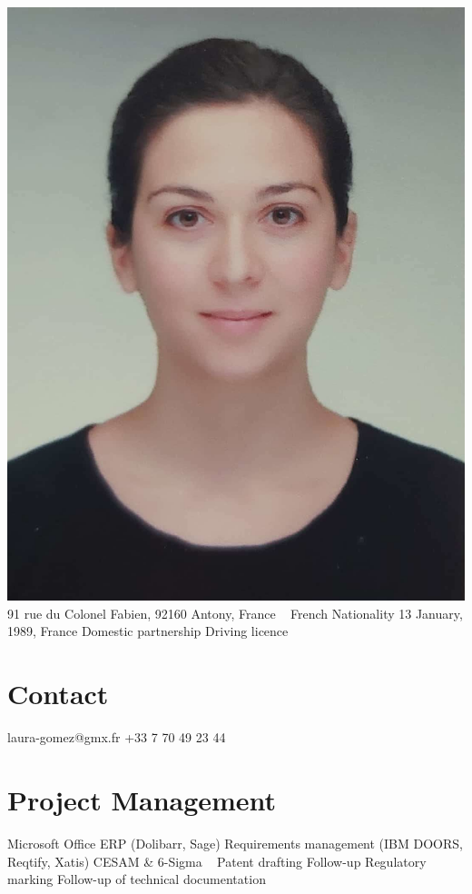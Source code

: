 \documentclass{cv-style}     %
\begin{document}


\begin{aside}
    \includegraphics[width=.8\columnwidth]{img/LG}
    91 rue du Colonel Fabien, 92160 Antony, France
    ~
    French Nationality
    13 January, 1989, France
    Domestic partnership
    Driving licence
    \section{Contact}
    laura-gomez@gmx.fr
    +33 7 70 49 23 44    
    \section{Project Management}
    Microsoft Office
    ERP (Dolibarr, Sage)
    Requirements management (IBM DOORS, Reqtify, Xatis)
    CESAM \& 6-Sigma
    ~
    Patent drafting
    Follow-up Regulatory marking
    Follow-up of technical documentation

\end{aside}
\end{document}
